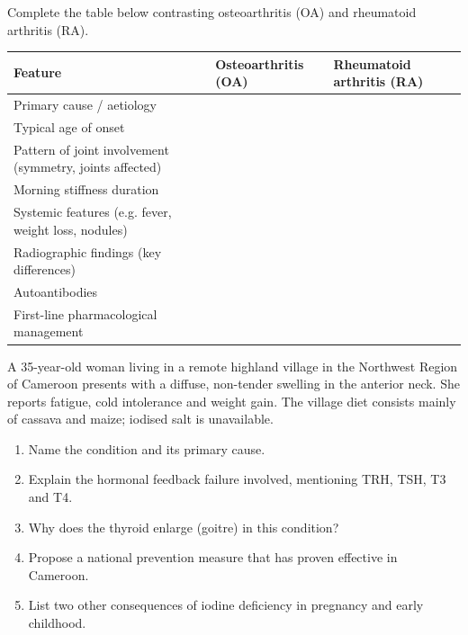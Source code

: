 \documentclass[11pt]{article}
\begin{document}
\begin{exercice}
Complete the table below contrasting osteoarthritis (OA) and rheumatoid arthritis (RA).

\begin{center}
\begin{tabularx}{\linewidth}{|l|X|X|}
\hline
\rowcolor{popblueL}
\textbf{Feature} & \textbf{Osteoarthritis (OA)} & \textbf{Rheumatoid arthritis (RA)} \\
\hline
Primary cause / aetiology & & \\
\hline
Typical age of onset & & \\
\hline
Pattern of joint involvement (symmetry, joints affected) & & \\
\hline
Morning stiffness duration & & \\
\hline
Systemic features (e.g. fever, weight loss, nodules) & & \\
\hline
Radiographic findings (key differences) & & \\
\hline
Autoantibodies & & \\
\hline
First-line pharmacological management & & \\
\hline
\end{tabularx}
\end{center}
\end{exercice}

\begin{exercice}
A 35-year-old woman living in a remote highland village in the Northwest Region of Cameroon presents with a diffuse, non-tender swelling in the anterior neck. She reports fatigue, cold intolerance and weight gain. The village diet consists mainly of cassava and maize; iodised salt is unavailable.
\begin{enumerate}
\item Name the condition and its primary cause.
\item Explain the hormonal feedback failure involved, mentioning TRH, TSH, T3 and T4.
\item Why does the thyroid enlarge (goitre) in this condition?
\item Propose a national prevention measure that has proven effective in Cameroon.
\item List two other consequences of iodine deficiency in pregnancy and early childhood.
\end{enumerate}
\end{exercice}
\end{document}
